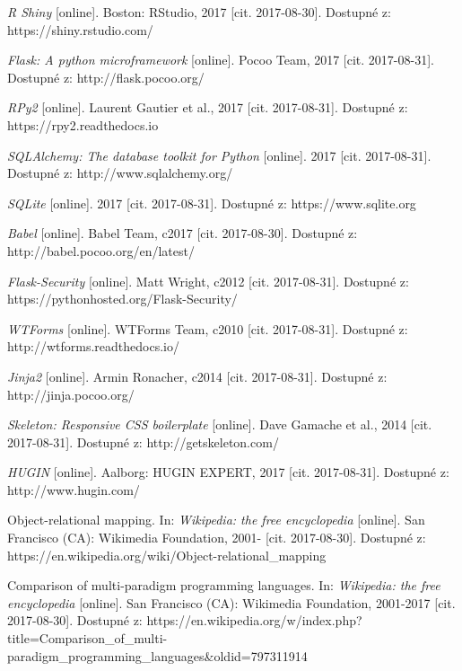 \documentclass[a4paper,twoside,12pt]{scrbook}
\begin{document}
\begin{thebibliography}{99}
	 \textit{R Shiny} [online]. Boston: RStudio, 2017 [cit. 2017-08-30]. Dostupné z: https://shiny.rstudio.com/

	 \textit{Flask: A python microframework} [online]. Pocoo Team, 2017 [cit. 2017-08-31]. Dostupné z: http://flask.pocoo.org/

	 \textit{RPy2} [online]. Laurent Gautier et al., 2017 [cit. 2017-08-31]. Dostupné z: https://rpy2.readthedocs.io

	 \textit{SQLAlchemy: The database toolkit for Python} [online]. 2017 [cit. 2017-08-31]. Dostupné z: http://www.sqlalchemy.org/

	 \textit{SQLite} [online]. 2017 [cit. 2017-08-31]. Dostupné z: https://www.sqlite.org

	 \textit{Babel} [online]. Babel Team, c2017 [cit. 2017-08-30]. Dostupné z: http://babel.pocoo.org/en/latest/

	 \textit{Flask-Security} [online]. Matt Wright, c2012 [cit. 2017-08-31]. Dostupné z: https://pythonhosted.org/Flask-Security/

	 \textit{WTForms} [online]. WTForms Team, c2010 [cit. 2017-08-31]. Dostupné z: http://wtforms.readthedocs.io/

	 \textit{Jinja2} [online]. Armin Ronacher, c2014 [cit. 2017-08-31]. Dostupné z: http://jinja.pocoo.org/

	 \textit{Skeleton: Responsive CSS boilerplate} [online]. Dave Gamache et al., 2014 [cit. 2017-08-31]. Dostupné z: http://getskeleton.com/

	 \textit{HUGIN} [online]. Aalborg: HUGIN EXPERT, 2017 [cit. 2017-08-31]. Dostupné z: http://www.hugin.com/


	 Object-relational mapping. In: \textit{Wikipedia: the free encyclopedia} [online]. San Francisco (CA): Wikimedia Foundation, 2001- [cit. 2017-08-30]. Dostupné z: https://en.wikipedia.org/wiki/Object-relational\_mapping

	 Comparison of multi-paradigm programming languages. In: \textit{Wikipedia: the free encyclopedia} [online]. San Francisco (CA): Wikimedia Foundation, 2001-2017 [cit. 2017-08-30]. Dostupné z: https://en.wikipedia.org/w/index.php?title=Comparison\_of\_multi-paradigm\_programming\_languages\&oldid=797311914


\end{thebibliography}
\end{document}
